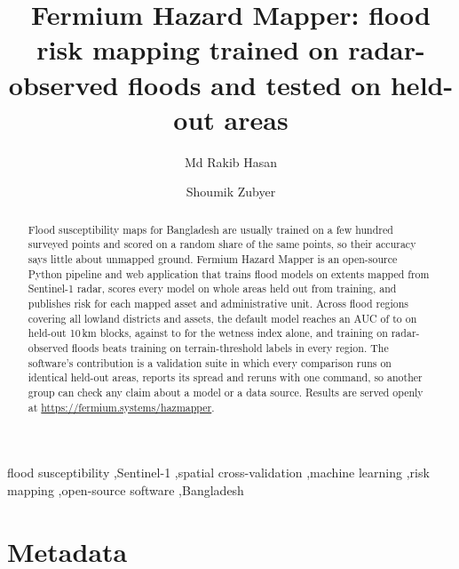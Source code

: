 \documentclass[preprint,12pt]{elsarticle}
\begin{document}
\begin{frontmatter}

\title{Fermium Hazard Mapper: flood risk mapping trained on radar-observed floods and tested on held-out areas}

\author[du,fs]{Md Rakib Hasan}
\author[du]{Shoumik Zubyer}

\begin{abstract}
Flood susceptibility maps for Bangladesh are usually trained on a few hundred surveyed points and scored on a random share of the same points, so their accuracy says little about unmapped ground. Fermium Hazard Mapper is an open-source Python pipeline and web application that trains flood models on extents mapped from Sentinel-1 radar, scores every model on whole areas held out from training, and publishes risk for each mapped asset and administrative unit. Across \NatRegions{} flood regions covering all \NatDistricts{} lowland districts and \NatAssets{} assets, the default model reaches an AUC of \NatAUCMin{} to \NatAUCMax{} on held-out 10\,km blocks, against \NatTWIAUCMin{} to \NatTWIAUCMax{} for the wetness index alone, and training on radar-observed floods beats training on terrain-threshold labels in every region. The software's contribution is a validation suite in which every comparison runs on identical held-out areas, reports its spread and reruns with one command, so another group can check any claim about a model or a data source. Results are served openly at \url{https://fermium.systems/hazmapper}.
\end{abstract}

\begin{keyword}
flood susceptibility \sep Sentinel-1 \sep spatial cross-validation \sep machine learning \sep risk mapping \sep open-source software \sep Bangladesh
\end{keyword}

\end{frontmatter}

\section*{Metadata}
\end{document}
